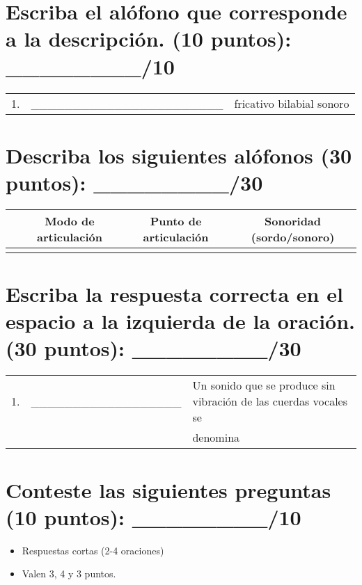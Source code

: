 \documentclass[12pt]{exam}
\begin{document}
\vspace{0.1in}

\section{Escriba el alófono que corresponde a la descripción. (10 puntos): \_\_\_\_\_\_\_\_/10}
\renewcommand{\arraystretch}{1.75}
	\begin{tabular}{@{}lll@{}}
	1.  & \_\_\_\_\_\_\_\_\_\_\_\_\_\_\_\_\_\_\_\_\_\_\_ & fricativo bilabial sonoro    \\
	\end{tabular}

\vspace{.2in}

\section{Describa los siguientes alófonos (30 puntos): \_\_\_\_\_\_\_\_/30}

	\begin{center}
		\begin{tabular}{|c|c|c|c|}
			\hline
			    & Modo de articulación & Punto de articulación & Sonoridad (sordo/sonoro)\\
			\hline
			[\texttheta] & & & \\
			\hline
		\end{tabular}
	\end{center}

\vspace{.2in}

\section{Escriba la respuesta correcta en el espacio a la izquierda de la oración. (30 puntos): \_\_\_\_\_\_\_\_/30}

\renewcommand{\arraystretch}{1.75}
	\begin{tabular}{@{}llp{2cm}@{}}
	 1.  & \_\_\_\_\_\_\_\_\_\_\_\_\_\_\_\_\_\_ & Un sonido que se produce sin vibración de las cuerdas vocales se \\&& denomina        \\
	\end{tabular}

\vspace{.2in}

\section{Conteste las siguientes preguntas (10 puntos): \_\_\_\_\_\_\_\_/10}
\begin{itemize}
	\item Respuestas cortas (2-4 oraciones)
	\item Valen 3, 4 y 3 puntos.
\end{itemize}
\end{document}
